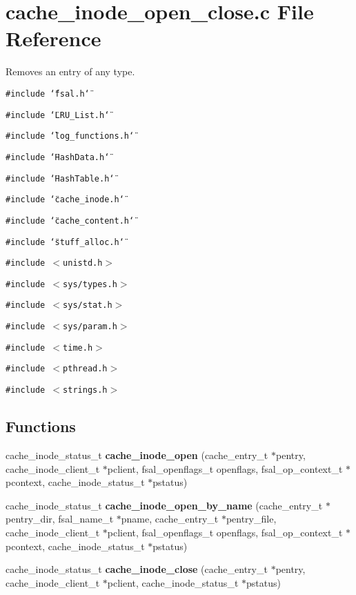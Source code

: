 \section{cache\_\-inode\_\-open\_\-close.c File Reference}
\label{cache__inode__open__close_8c}
Removes an entry of any type. 

{\tt \#include \char`\"{}fsal.h\char`\"{}}\par
{\tt \#include \char`\"{}LRU\_\-List.h\char`\"{}}\par
{\tt \#include \char`\"{}log\_\-functions.h\char`\"{}}\par
{\tt \#include \char`\"{}Hash\-Data.h\char`\"{}}\par
{\tt \#include \char`\"{}Hash\-Table.h\char`\"{}}\par
{\tt \#include \char`\"{}cache\_\-inode.h\char`\"{}}\par
{\tt \#include \char`\"{}cache\_\-content.h\char`\"{}}\par
{\tt \#include \char`\"{}stuff\_\-alloc.h\char`\"{}}\par
{\tt \#include $<$unistd.h$>$}\par
{\tt \#include $<$sys/types.h$>$}\par
{\tt \#include $<$sys/stat.h$>$}\par
{\tt \#include $<$sys/param.h$>$}\par
{\tt \#include $<$time.h$>$}\par
{\tt \#include $<$pthread.h$>$}\par
{\tt \#include $<$strings.h$>$}\par
\subsection*{Functions}
\begin{CompactItemize}
\item 
cache\_\-inode\_\-status\_\-t {\bf cache\_\-inode\_\-open} (cache\_\-entry\_\-t $\ast$pentry, cache\_\-inode\_\-client\_\-t $\ast$pclient, fsal\_\-openflags\_\-t openflags, fsal\_\-op\_\-context\_\-t $\ast$pcontext, cache\_\-inode\_\-status\_\-t $\ast$pstatus)
\item 
cache\_\-inode\_\-status\_\-t {\bf cache\_\-inode\_\-open\_\-by\_\-name} (cache\_\-entry\_\-t $\ast$pentry\_\-dir, fsal\_\-name\_\-t $\ast$pname, cache\_\-entry\_\-t $\ast$pentry\_\-file, cache\_\-inode\_\-client\_\-t $\ast$pclient, fsal\_\-openflags\_\-t openflags, fsal\_\-op\_\-context\_\-t $\ast$pcontext, cache\_\-inode\_\-status\_\-t $\ast$pstatus)
\item 
cache\_\-inode\_\-status\_\-t {\bf cache\_\-inode\_\-close} (cache\_\-entry\_\-t $\ast$pentry, cache\_\-inode\_\-client\_\-t $\ast$pclient, cache\_\-inode\_\-status\_\-t $\ast$pstatus)
\end{CompactItemize}



